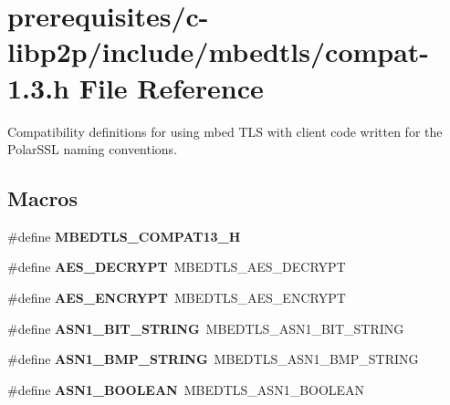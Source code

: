 \hypertarget{compat-1_83_8h}{}\section{prerequisites/c-\/libp2p/include/mbedtls/compat-\/1.3.h File Reference}
\label{compat-1_83_8h}


Compatibility definitions for using mbed T\+LS with client code written for the Polar\+S\+SL naming conventions.  


\subsection*{Macros}
\begin{DoxyCompactItemize}
\item 
\mbox{\label{compat-1_83_8h_a1d4d0ff7cc5b7dcd678e43dbf3103c65}} 
\#define {\bfseries M\+B\+E\+D\+T\+L\+S\+\_\+\+C\+O\+M\+P\+A\+T13\+\_\+H}
\item 
\mbox{\label{compat-1_83_8h_a8a3cf36dc3c8860519f33907bad182c9}} 
\#define {\bfseries A\+E\+S\+\_\+\+D\+E\+C\+R\+Y\+PT}~M\+B\+E\+D\+T\+L\+S\+\_\+\+A\+E\+S\+\_\+\+D\+E\+C\+R\+Y\+PT
\item 
\mbox{\label{compat-1_83_8h_a91e721bca5c6db6402fc3a4781d69b10}} 
\#define {\bfseries A\+E\+S\+\_\+\+E\+N\+C\+R\+Y\+PT}~M\+B\+E\+D\+T\+L\+S\+\_\+\+A\+E\+S\+\_\+\+E\+N\+C\+R\+Y\+PT
\item 
\mbox{\label{compat-1_83_8h_a1493defdd429594af36feaf6309cc70a}} 
\#define {\bfseries A\+S\+N1\+\_\+\+B\+I\+T\+\_\+\+S\+T\+R\+I\+NG}~M\+B\+E\+D\+T\+L\+S\+\_\+\+A\+S\+N1\+\_\+\+B\+I\+T\+\_\+\+S\+T\+R\+I\+NG
\item 
\mbox{\label{compat-1_83_8h_ae17ad2492005596109a4179b6f22cc62}} 
\#define {\bfseries A\+S\+N1\+\_\+\+B\+M\+P\+\_\+\+S\+T\+R\+I\+NG}~M\+B\+E\+D\+T\+L\+S\+\_\+\+A\+S\+N1\+\_\+\+B\+M\+P\+\_\+\+S\+T\+R\+I\+NG
\item 
\mbox{\label{compat-1_83_8h_a5ecb3f6655f48694a6326657290d4996}} 
\#define {\bfseries A\+S\+N1\+\_\+\+B\+O\+O\+L\+E\+AN}~M\+B\+E\+D\+T\+L\+S\+\_\+\+A\+S\+N1\+\_\+\+B\+O\+O\+L\+E\+AN

\end{DoxyCompactItemize}
